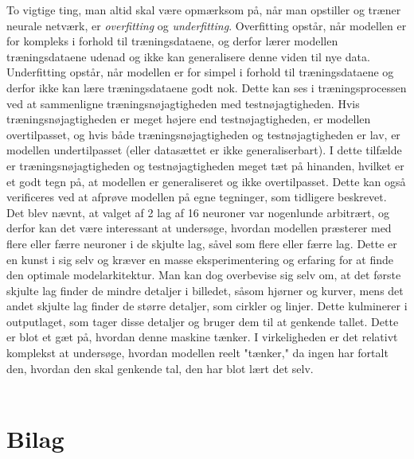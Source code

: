 \documentclass{article}
\begin{document}
To vigtige ting, man altid skal være opmærksom på, når man opstiller og træner neurale netværk, er \textit{overfitting} og \textit{underfitting}. Overfitting opstår, når modellen er for kompleks i forhold til træningsdataene, og derfor lærer modellen træningsdataene udenad og ikke kan generalisere denne viden til nye data. Underfitting opstår, når modellen er for simpel i forhold til træningsdataene og derfor ikke kan lære træningsdataene godt nok. Dette kan ses i træningsprocessen ved at sammenligne træningsnøjagtigheden med testnøjagtigheden. Hvis træningsnøjagtigheden er meget højere end testnøjagtigheden, er modellen overtilpasset, og hvis både træningsnøjagtigheden og testnøjagtigheden er lav, er modellen undertilpasset (eller datasættet er ikke generaliserbart). I dette tilfælde er træningsnøjagtigheden og testnøjagtigheden meget tæt på hinanden, hvilket er et godt tegn på, at modellen er generaliseret og ikke overtilpasset. Dette kan også verificeres ved at afprøve modellen på egne tegninger, som tidligere beskrevet. Det blev nævnt, at valget af 2 lag af 16 neuroner var nogenlunde arbitrært, og derfor kan det være interessant at undersøge, hvordan modellen præsterer med flere eller færre neuroner i de skjulte lag, såvel som flere eller færre lag. Dette er en kunst i sig selv og kræver en masse eksperimentering og erfaring for at finde den optimale modelarkitektur. Man kan dog overbevise sig selv om, at det første skjulte lag finder de mindre detaljer i billedet, såsom hjørner og kurver, mens det andet skjulte lag finder de større detaljer, som cirkler og linjer. Dette kulminerer i outputlaget, som tager disse detaljer og bruger dem til at genkende tallet. \parencite{Sanderson_2017} Dette er blot et gæt på, hvordan denne maskine tænker. I virkeligheden er det relativt komplekst at undersøge, hvordan modellen reelt "tænker," da ingen har fortalt den, hvordan den skal genkende tal, den har blot lært det selv.\\\\









\newpage
\printbibliography

\newpage
\section{Bilag}
\end{document}

